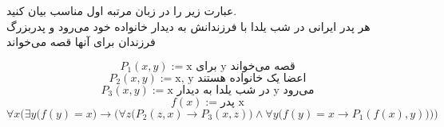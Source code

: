 عبارت زیر را در زبان مرتبه اول مناسب بیان کنید.\\
هر پدر ایرانی در شب یلدا با فرزندانش به دیدار خانواده خود می‌رود و پدربزرگ فرزندان برای آنها قصه می‌خواند
\quad\vspace{0.5 cm}	
\begin{ans}
	$$
		{P_1}(x, y) := \text{x برای y قصه می‌خواند}
	$$
	$$ 
		{P_2}(x, y) := \text{x, y اعضا یک خانواده هستند}
	$$
	$$
		{P_3}(x, y) := \text{x در شب یلدا به دیدار y می‌رود}
	$$
	$$
		f(x) := \text{پدر x}
	$$
	$$
		\forall x \Bigg(\exists y \Big(f(y) = x\Big) \rightarrow \bigg({\forall z \Big({P_2}(z, x) \rightarrow {P_3}(x, z)\Big) \wedge \forall y \Big(f(y) = x \rightarrow {P_1}(f(x), y)\Big)\bigg)}\Bigg)
	$$
\end{ans}
